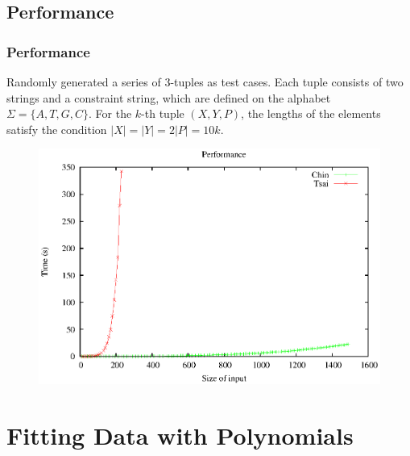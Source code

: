 \documentclass[10pt]{beamer}
\begin{document}
\subsection{Performance}
\begin{frame}
  \frametitle{Performance}
Randomly generated a series of 3-tuples as test cases. Each tuple consists of two strings and a constraint string, which are defined on the alphabet $\Sigma=\{A,T,G,C\}$. 
For the $k$-th tuple $(X,Y,P)$, the lengths of the elements satisfy the condition $|X|=|Y|=2|P| = 10k$. 
\begin{center}
\begin{figure}[ht]
	\centering
	\includegraphics[scale=0.55]{images/experiment.eps}
\end{figure}
\end{center}
\end{frame}

\section{Fitting Data with Polynomials}
\end{document}
